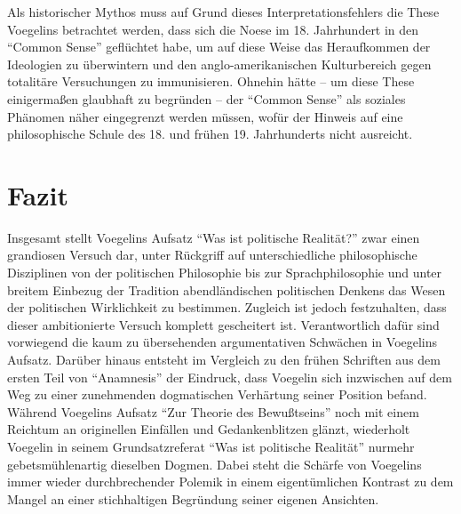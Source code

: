 Als historischer Mythos muss auf Grund dieses Interpretationsfehlers die These
Voegelins betrachtet werden, dass sich die Noese im 18. Jahrhundert in den
"`Common Sense"' geflüchtet habe, um auf diese Weise das Heraufkommen der
Ideologien zu überwintern und den anglo-amerikanischen Kulturbereich gegen
totalitäre Versuchungen zu immunisieren. Ohnehin hätte -- um diese These
einigermaßen glaubhaft zu begründen -- der "`Common Sense"' als soziales
Phänomen näher eingegrenzt werden müssen, wofür der Hinweis auf eine
philosophische Schule des 18. und frühen 19. Jahrhunderts nicht ausreicht.

\section{Fazit}

Insgesamt stellt Voegelins Aufsatz "`Was ist politische Realität?"' zwar
einen grandiosen Versuch dar, unter Rückgriff auf unterschiedliche
philosophische Disziplinen von der politischen Philosophie bis zur
Sprachphilosophie und unter breitem Einbezug der Tradition
abendländischen politischen Denkens das Wesen der politischen
Wirklichkeit zu bestimmen. Zugleich ist jedoch festzuhalten, dass dieser
ambitionierte Versuch komplett gescheitert ist.  Verantwortlich
dafür sind vorwiegend die kaum zu übersehenden argumentativen Schwächen
in Voegelins Aufsatz. Darüber hinaus entsteht im Vergleich zu den frühen
Schriften aus dem ersten Teil von "`Anamnesis"' der Eindruck, dass
Voegelin sich inzwischen auf dem Weg zu einer zunehmenden dogmatischen
Verhärtung seiner Position befand. Während Voegelins Aufsatz "`Zur
Theorie des Bewußtseins"' noch mit einem Reichtum an originellen
Einfällen und Gedankenblitzen glänzt, wiederholt Voegelin in seinem
Grundsatzreferat "`Was ist politische Realität"' nurmehr
gebetsmühlenartig dieselben Dogmen. Dabei steht die Schärfe von
Voegelins immer wieder durchbrechender Polemik in einem eigentümlichen
Kontrast zu dem Mangel an einer stichhaltigen Begründung seiner eigenen
Ansichten.























